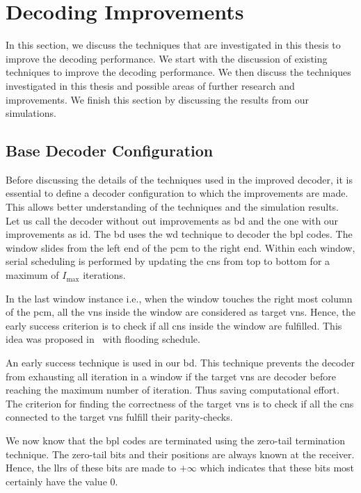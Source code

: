 \section{Decoding Improvements}\label{sec:dec_improve}
In this section, we discuss the techniques that are investigated in this thesis to improve the decoding performance. We start with the discussion of existing techniques to improve the decoding performance. We then discuss the techniques investigated in this thesis and possible areas of further research and improvements. We finish this section by discussing the results from our simulations.

\subsection{Base Decoder Configuration}
Before discussing the details of the techniques used in the improved decoder, it is essential to define a decoder configuration to which the improvements are made. This allows better understanding of the techniques and the simulation results. Let us call the decoder without out improvements as \ac{bd} and the one with our improvements as \ac{id}. The \ac{bd} uses the \ac{wd} technique to decoder the \ac{bpl} codes. The window slides from the left end of the \ac{pcm} to the right end. Within each window, serial scheduling is performed by updating the \acp{cn} from top to bottom for a maximum of $I_{\text{max}}$ iterations.

In the last window instance i.e., when the window touches the right most column of the \ac{pcm}, all the \acp{vn} inside the window are considered as target \acp{vn}. Hence, the early success criterion is to check if all \acp{cn} inside the window are fulfilled. This idea was proposed in~\cite{Ali2018} with flooding schedule.

An early success technique is used in our \ac{bd}. This technique prevents the decoder from exhausting all iteration in a window if the target \acp{vn} are decoder before reaching the maximum number of iteration. Thus saving computational effort. The criterion for finding the correctness of the target \acp{vn} is to check if all the \acp{cn} connected to the target \acp{vn} fulfill their parity-checks.

We now know that the \ac{bpl} codes are terminated using the zero-tail termination technique. The zero-tail bits and their positions are always known at the receiver. Hence, the \acp{llr} of these bits are made to $+\infty$ which indicates that these bits most certainly have the value 0.

